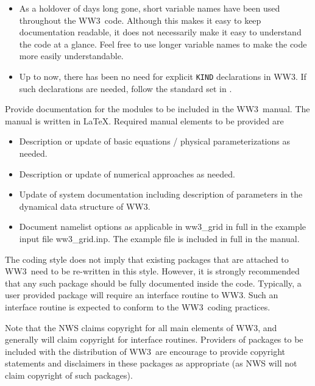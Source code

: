 \documentclass[12pt]{article}
\newcommand{\ws}{WW3}
\newcommand{\file}{\sf}
\newcommand{\code}{\tt}
\newcounter{mylistno}
\begin{document}
\begin{list}{)}{ \rightmargin 8mm
                                \leftmargin 10mm }
\begin{itemize}
\item As a holdover of days long gone, short variable names have been used
      throughout the \ws\ code. Although this makes it easy to keep
      documentation readable, it does not necessarily make it easy to
      understand the code at a glance. Feel free to use longer variable names
      to make the code more easily understandable.
\item Up to now, there has been no need for explicit {\code KIND} declarations
      in \ws. If such declarations are needed, follow the standard set in
      \cite{rep:PvD08}.
\end{itemize}

\item Provide documentation for the modules to be included in the \ws\
      manual. The manual is written in \LaTeX. Required manual elements to be
      provided are

\begin{itemize}
\item Description or update of basic equations / physical parameterizations as
      needed.
\item Description or update of numerical approaches as needed.
\item Update of system documentation including description of parameters in
      the dynamical data structure of \ws.
\item Document namelist options as applicable in {\file ww3\_grid} in full
      in the example input file {\file ww3\_grid.inp}. The example file is
      included in full in the manual.
\end{itemize}

\end{list}

\noindent
The coding style does not imply that existing packages that are attached to
\ws\ need to be re-written in this style. However, it is strongly recommended
that any such package should be fully documented inside the code. Typically, a
user provided package will require an interface routine to \ws. Such an
interface routine is expected to conform to the \ws\ coding practices.

Note that the NWS claims copyright for all main elements of \ws, and generally
will claim copyright for interface routines. Providers of packages to be
included with the distribution of \ws\ are encourage to provide copyright
statements and disclaimers in these packages as appropriate (as NWS will not
claim copyright of such packages).
\end{document}
